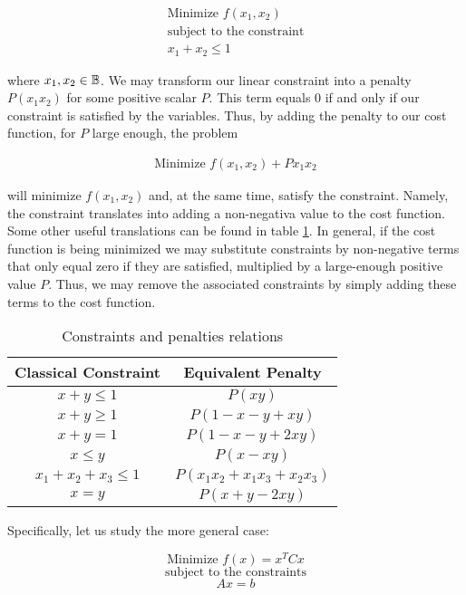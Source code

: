 \begin{gather*}
	\text{Minimize } f(x_1, x_2) \\
	\text{subject to the constraint} \\
	x_1 + x_2 \leq 1
\end{gather*}

where $x_1, x_2 \in \mathbb{B}$. We may transform our linear constraint into a penalty $P(x_1x_2)$ for some positive scalar $P$. This term equals $0$ if and only if our constraint is satisfied by the variables. Thus, by adding the penalty to our cost function, for $P$ large enough, the problem

\begin{gather*}
	\text{Minimize } f(x_1, x_2) + Px_1x_2
\end{gather*}

will minimize $f(x_1, x_2)$ and, at the same time, satisfy the constraint. Namely, the constraint translates into adding a non-negativa value to the cost function. Some other useful translations can be found in table \ref{penalties-table}. In general, if the cost function is being minimized we may substitute constraints by non-negative terms that only equal zero if they are satisfied, multiplied by a large-enough positive value $P$. Thus, we may remove the associated constraints by simply adding these terms to the cost function. 

\begin{table}[h]
	\centering
	\begin{tabular}{cc}
		Classical Constraint 		& Equivalent Penalty   			\\ \hline
		$x + y \leq 1$       		& $P(xy)$              			\\
		$x + y \geq 1$       		& $P(1 - x - y + xy)$  			\\
		$x + y = 1$          		& $P(1 - x - y + 2xy)$ 			\\
		$x \leq y$       			& $P(x - xy)$      
		
		   			\\
		$x_1 + x_2 + x_3 \leq 1$	& $P(x_1x_2 + x_1x_3 + x_2x_3)$	\\
		$x = y$              		& $P(x + y - 2xy)$    
	\end{tabular}
	\caption{Constraints and penalties relations}
	\label{penalties-table}
\end{table}

Specifically, let us study the more general case:

$$ \text{Minimize } f(x) = x^T C x $$
$$ \text{subject to the constraints} $$
$$ Ax = b $$

